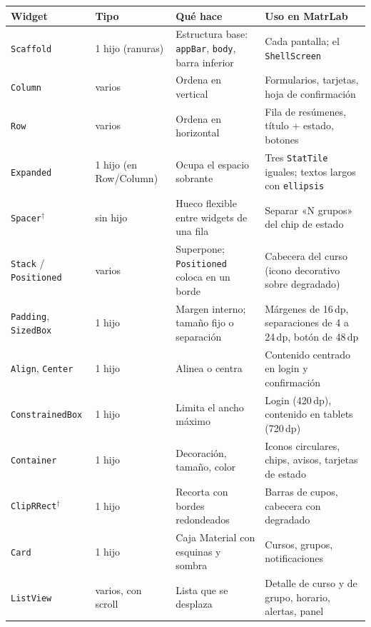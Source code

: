 \begin{table}[H]
	\centering\footnotesize
	\begin{tabularx}{\textwidth}{|p{2.7cm}|p{1.8cm}|X|X|}
		\hline
		\rowcolor{tablebackground}\color{white}\textbf{Widget} & \color{white}\textbf{Tipo} & \color{white}\textbf{Qué hace} & \color{white}\textbf{Uso en MatrLab}\\
		\hline
		\texttt{Scaffold} & 1 hijo (ranuras) & Estructura base: \texttt{appBar}, \texttt{body}, barra inferior & Cada pantalla; el \texttt{ShellScreen} \\\hline
		\texttt{Column} & varios & Ordena en vertical & Formularios, tarjetas, hoja de confirmación \\\hline
		\texttt{Row} & varios & Ordena en horizontal & Fila de resúmenes, título + estado, botones \\\hline
		\texttt{Expanded} & 1 hijo (en Row/Column) & Ocupa el espacio sobrante & Tres \texttt{StatTile} iguales; textos largos con \texttt{ellipsis} \\\hline
		\texttt{Spacer}$^\dagger$ & sin hijo & Hueco flexible entre widgets de una fila & Separar «N grupos» del chip de estado \\\hline
		\texttt{Stack} / \texttt{Positioned} & varios & Superpone; \texttt{Positioned} coloca en un borde & Cabecera del curso (icono decorativo sobre degradado) \\\hline
		\texttt{Padding}, \texttt{SizedBox} & 1 hijo & Margen interno; tamaño fijo o separación & Márgenes de 16\,dp, separaciones de 4 a 24\,dp, botón de 48\,dp \\\hline
		\texttt{Align}, \texttt{Center} & 1 hijo & Alinea o centra & Contenido centrado en login y confirmación \\\hline
		\texttt{ConstrainedBox} & 1 hijo & Limita el ancho máximo & Login (420\,dp), contenido en tablets (720\,dp) \\\hline
		\texttt{Container} & 1 hijo & Decoración, tamaño, color & Iconos circulares, chips, avisos, tarjetas de estado \\\hline
		\texttt{ClipRRect}$^\dagger$ & 1 hijo & Recorta con bordes redondeados & Barras de cupos, cabecera con degradado \\\hline
		\texttt{Card} & 1 hijo & Caja Material con esquinas y sombra & Cursos, grupos, notificaciones \\\hline
		\texttt{ListView} & varios, con scroll & Lista que se desplaza & Detalle de curso y de grupo, horario, alertas, panel \\\hline

\end{tabularx}
\end{table}

